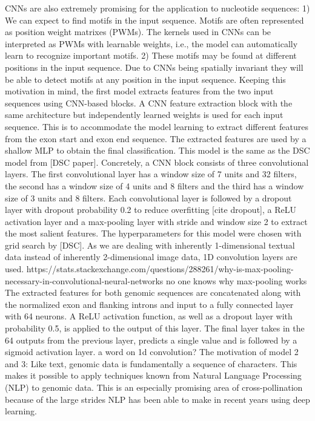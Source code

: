 CNNs are also extremely promising for the application to nucleotide sequences:
1) We can expect to find motifs in the input sequence. Motifs are often represented as position weight matrixes (PWMs). The kernels used in CNNs can be interpreted as PWMs with learnable weights, i.e., the model can automatically learn to recognize important motifs.
2) These motifs may be found at different positions in the input sequence. Due to CNNs being spatially invariant they will be able to detect motifs at any position in the input sequence.
Keeping this motivation in mind, the first model extracts features from the two input sequences using CNN-based blocks. A CNN feature extraction block with the same architecture but independently learned weights is used for each input sequence. This is to accommodate the model learning to extract different features from the exon start and exon end sequence. The extracted features are used by a shallow MLP to obtain the final classification. This model is the same as the DSC model from [DSC paper].
Concretely, a CNN block consists of three convolutional layers. The first convolutional layer has a window size of 7 units and 32 filters, the second has a window size of 4 units and 8 filters and the third has a window size of 3 units and 8 filters. Each convolutional layer is followed by a dropout layer with dropout probability 0.2 to reduce overfitting [cite dropout], a ReLU activation layer and a max-pooling layer with stride and window size 2 to extract the most salient features. The hyperparameters for this model were chosen with grid search by [DSC]. As we are dealing with inherently 1-dimensional textual data instead of inherently 2-dimensional image data, 1D convolution layers are used.
https://stats.stackexchange.com/questions/288261/why-is-max-pooling-necessary-in-convolutional-neural-networks
no one knows why max-pooling works
The extracted features for both genomic sequences are concatenated along with the normalized exon and flanking introns and input to a fully connected layer with 64 neurons. A ReLU activation function, as well as a dropout layer with probability 0.5, is applied to the output of this layer. The final layer takes in the 64 outputs from the previous layer, predicts a single value and is followed by a sigmoid activation layer.
a word on 1d convolution?
The motivation of model 2 and 3:
Like text, genomic data is fundamentally a sequence of characters.
This makes it possible to apply techniques known from Natural Language Processing (NLP) to genomic data. This is an especially promising area of cross-pollination because of the large strides NLP has been able to make in recent years using deep learning.
